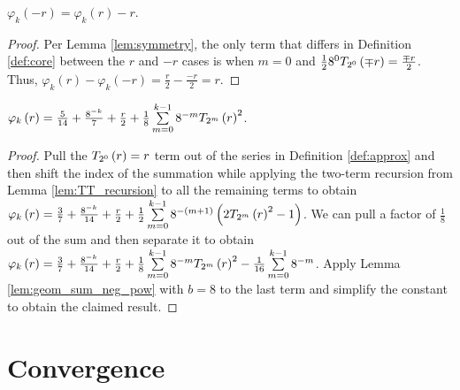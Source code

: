 \begin{lemma}
  \label{lem:functional_equation}
  $\varphi_k\left(-r\right) = \varphi_k\left(r\right) - r$.
\end{lemma}
\begin{proof}
  Per Lemma \ref{lem:symmetry}, the only term that differs in Definition \ref{def:core} between the $r$ and $-r$ cases is when $m = 0$ and $\frac{1}{2} 8^{0} \TT[\mp r]{0} = \frac{\mp r}{2}$. Thus, $\varphi_k\left(r\right) - \varphi_k\left(-r\right) = \frac{r}{2} - \frac{-r}{2} = r$.
\end{proof}
\begin{lemma}
  \label{lem:SOS}
  $\varphi_k\left(r\right) = \frac{5}{14} + \frac{8^{-k}}{7} + \frac{r}{2} + \frac{1}{8} \sum\limits_{m = 0}^{k - 1} 8^{-m} \TT[r]{m}^2$. 
\end{lemma}
\begin{proof}
Pull the $\TT[r]{0} = r$ term out of the series in Definition \ref{def:approx} and then shift the index of the summation while applying the two-term recursion from Lemma \ref{lem:TT_recursion} to all the remaining terms to obtain $\varphi_k\left(r\right) = \threesevenths + \offset + \frac{r}{2} + \frac{1}{2} \sum\limits_{m = 0}^{k - 1} 8^{-\left(m + 1\right)} \left(2 \TT[r]{m}^2 - 1\right)$. We can pull a factor of $\frac{1}{8}$ out of the sum and then separate it to obtain $\varphi_k\left(r\right) = \threesevenths + \offset + \frac{r}{2} + \frac{1}{8} \sum\limits_{m = 0}^{k - 1} 8^{-m} \TT[r]{m}^2 - \frac{1}{16} \sum\limits_{m = 0}^{k - 1} 8^{-m}$. Apply Lemma \ref{lem:geom_sum_neg_pow} with $b = 8$ to the last term and simplify the constant to obtain the claimed result.
\end{proof}

\renewcommand{\thetheorem}{\thesection.\arabic{theorem}}

\section{Convergence}\label{sec:Convergence}


